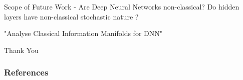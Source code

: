 \documentclass{beamer}
\begin{document}
 \begin{frame}{Scope of Future Work - Are Deep Neural Networks non-classical?}
     Do hidden layers have non-classical stochastic nature ? \\
     \vspace{10mm}
     \Large{\centerline{"Analyse Classical Information Manifolds for DNN"}}
     \vspace{10mm}
 \end{frame}
\begin{frame}
\Huge{\centerline{Thank You}}
\end{frame}


\begin{frame}[allowframebreaks]
\frametitle{References}
\printbibliography

\end{frame}
\end{document}
